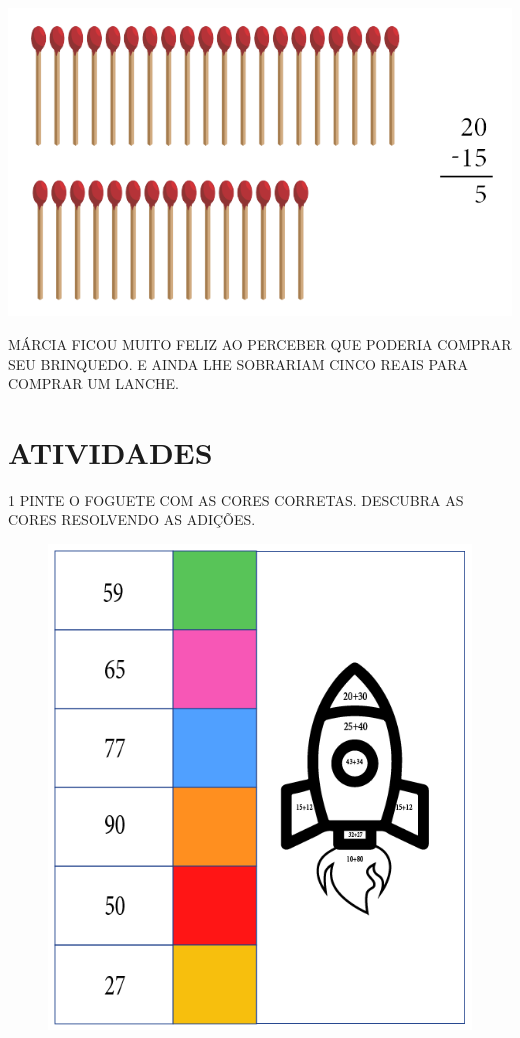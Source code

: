 {\includegraphics[width=\textwidth]{./media/SAEB_1ANO_MAT_FIGURA18.png}

MÁRCIA FICOU MUITO FELIZ AO PERCEBER QUE PODERIA COMPRAR SEU BRINQUEDO.
E AINDA LHE SOBRARIAM CINCO REAIS PARA COMPRAR UM LANCHE.
}

\section*{ATIVIDADES}

\num{1} PINTE O FOGUETE COM AS CORES CORRETAS. DESCUBRA AS CORES RESOLVENDO AS
ADIÇÕES.


\begin{figure}[htpb!]
\centering
\includegraphics[width=\textwidth]{./media/SAEB_1ANO_MAT_FIGURA19.png}
\end{figure}

